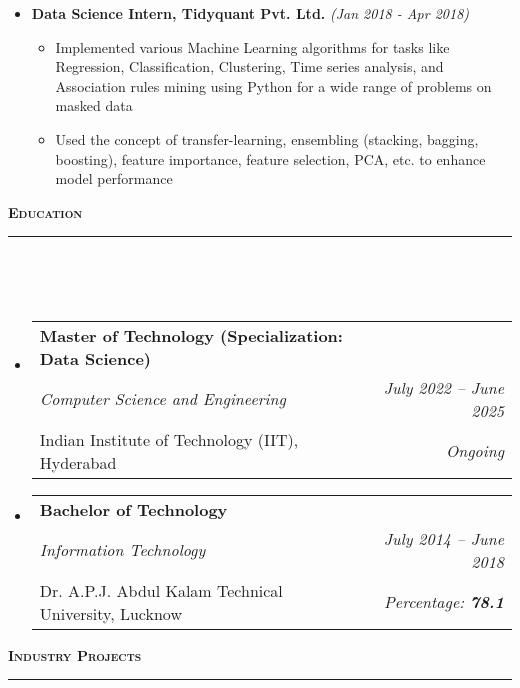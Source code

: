 \documentclass[a4paper,10pt]{article}
\makeatletter
\newcommand{\isep}{-2 pt}
\newcommand{\lsep}{-0.5cm}
\newcommand{\resheading}[1]{{\small
        {
            \begin{minipage}
                {0.992\textwidth}\textbf{{\textsc{#1 \vphantom{p\^{E}} }}}
                \\[-0.3cm]
                \hrule
            \end{minipage}
            \\[-0.5cm]
        }
 }}
\newcommand{\resEduHeading}[6]{
  \begin{tabular*}{7.1in}{l @{\extracolsep{\fill}} r}
    \textbf{\normalsize #1} \\
    \textit{#2} & \textit{#3} \\
    {\normalsize #4} & \textit{{#5} \textbf{#6}}
  \end{tabular*}
}
\makeatother
\begin{document}
\begin{itemize}
    \item \textbf{Data Science Intern, Tidyquant Pvt. Ltd.} \hfill {\emph{(Jan 2018 - Apr 2018)}}
    \\ [-0.6cm]
    \begin{itemize}\itemsep \isep
        \item Implemented various Machine Learning algorithms for tasks like Regression, Classification, Clustering, Time series analysis, and Association rules mining using Python for a wide range of problems on masked data 
        \item Used the concept of transfer-learning, ensembling (stacking, bagging, boosting), feature importance, feature selection, PCA, etc. to enhance model performance 
    \\ [-0.5cm]
    \end{itemize}
\end{itemize}
\vspace{2pt}
\noindent
\resheading{\textbf{\large Education}}\\[\lsep]
\vspace{8pt}
\begin{itemize}
    \item \resEduHeading{Master of Technology (Specialization: Data Science)}
    {Computer Science and Engineering}
    {July 2022 -- June 2025}
    {Indian Institute of Technology (IIT), Hyderabad}
    {Ongoing}
    {}
    \item \resEduHeading{Bachelor of Technology}
    {Information Technology}
    {July 2014 -- June 2018}
    {Dr. A.P.J. Abdul Kalam Technical University, Lucknow}
    {Percentage:}
    {78.1}
\end{itemize}
\vspace{2pt}
\noindent
\resheading{\textbf{\large Industry Projects}}\\[\lsep] 
\end{document}
